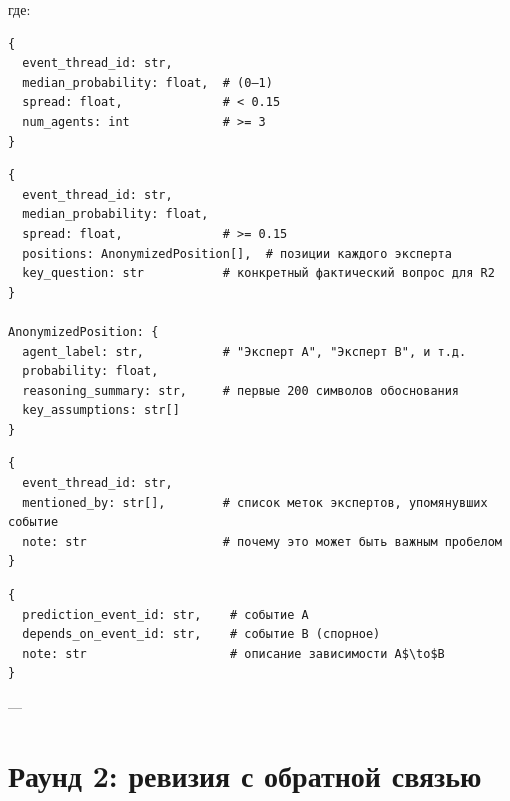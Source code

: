 где:

\begin{definition}
\begin{verbatim}
{
  event_thread_id: str,
  median_probability: float,  # (0–1)
  spread: float,              # < 0.15
  num_agents: int             # >= 3
}
\end{verbatim}
\end{definition}

\begin{definition}
\begin{verbatim}
{
  event_thread_id: str,
  median_probability: float,
  spread: float,              # >= 0.15
  positions: AnonymizedPosition[],  # позиции каждого эксперта
  key_question: str           # конкретный фактический вопрос для R2
}

AnonymizedPosition: {
  agent_label: str,           # "Эксперт A", "Эксперт B", и т.д.
  probability: float,
  reasoning_summary: str,     # первые 200 символов обоснования
  key_assumptions: str[]
}
\end{verbatim}
\end{definition}

\begin{definition}
\begin{verbatim}
{
  event_thread_id: str,
  mentioned_by: str[],        # список меток экспертов, упомянувших событие
  note: str                   # почему это может быть важным пробелом
}
\end{verbatim}
\end{definition}

\begin{definition}
\begin{verbatim}
{
  prediction_event_id: str,    # событие A
  depends_on_event_id: str,    # событие B (спорное)
  note: str                    # описание зависимости A$\to$B
}
\end{verbatim}
\end{definition}

---


\section{Раунд 2: ревизия с обратной связью}

